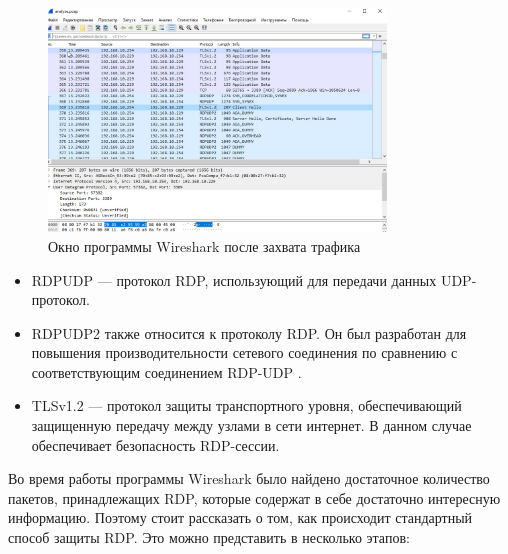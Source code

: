 \documentclass[bachelor, och, coursework]{SCWorks}
\begin{document}
  \begin{figure}[H]
    \centering
    \includegraphics[width=0.8\textwidth]{photo/wireshark1.png}
    \caption{Окно программы Wireshark после захвата трафика}
    \label{wireshark1}
  \end{figure}

  \begin{itemize}
    \item RDPUDP --- протокол RDP, использующий для передачи данных UDP-протокол.
    \item RDPUDP2 также относится к протоколу RDP. Он был разработан для повышения производительности сетевого соединения по сравнению
    с соответствующим соединением RDP-UDP \cite{rdpudp}. 
    \item TLSv1.2 --- протокол защиты транспортного уровня, обеспечивающий защищенную передачу между узлами в сети интернет. В данном случае обеспечивает
    безопасность RDP-сессии.
  \end{itemize}
  
  Во время работы программы Wireshark было найдено достаточное количество пакетов, принадлежащих RDP, которые содержат в себе достаточно интересную
  информацию. Поэтому стоит рассказать о том, как происходит стандартный способ защиты RDP. Это можно представить в несколько этапов:
\end{document}
